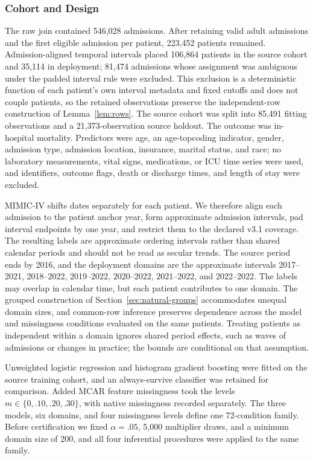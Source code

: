 \documentclass[twoside,11pt]{article}
\begin{document}
\subsubsection{Cohort and Design}
The raw join contained 546,028 admissions. After retaining valid adult admissions and the first
eligible admission per patient, 223,452 patients remained. Admission-aligned temporal
intervals placed 106,864 patients in the source cohort and 35,114 in deployment; 81,474
admissions whose assignment was ambiguous under the padded interval rule were excluded. This
exclusion is a deterministic function of each patient's own interval metadata and fixed
cutoffs and does not couple patients, so the retained observations preserve the
independent-row construction of Lemma~\ref{lem:rows}. The source cohort was split into 85,491
fitting observations and a 21,373-observation source holdout. The outcome was in-hospital
mortality. Predictors were age, an age-topcoding indicator, gender, admission type, admission
location, insurance, marital status, and race; no laboratory measurements, vital signs,
medications, or ICU time series were used, and identifiers, outcome flags, death or discharge
times, and length of stay were excluded.

MIMIC-IV shifts dates separately for each patient. We therefore align each admission to the
patient anchor year, form approximate admission intervals, pad interval endpoints by one year,
and restrict them to the declared v3.1 coverage. The resulting labels are approximate ordering
intervals rather than shared calendar periods and should not be read as secular trends. The
source period ends by 2016, and the deployment domains are the approximate intervals
2017--2021, 2018--2022, 2019--2022, 2020--2022, 2021--2022, and 2022--2022. The labels may
overlap in calendar time, but each patient contributes to one domain. The grouped construction
of Section~\ref{sec:natural-groups} accommodates unequal domain sizes, and common-row inference
preserves dependence across the model and missingness conditions evaluated on the same
patients. Treating patients as independent within a domain ignores shared period effects, such
as waves of admissions or changes in practice; the bounds are conditional on that assumption.

Unweighted logistic regression and histogram gradient boosting were fitted on the source
training cohort, and an always-survive classifier was retained for comparison. Added MCAR
feature missingness took the levels $m\in\{0,.10,.20,.30\}$, with native missingness recorded
separately. The three models, six domains, and four missingness levels define one
72-condition family. Before certification we fixed $\alpha=.05$, 5,000 multiplier draws, and
a minimum domain size of 200, and all four inferential procedures were applied to the same
family.
\end{document}
